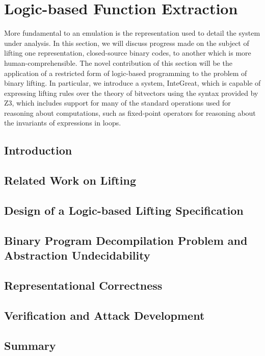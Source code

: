 \chapter{Logic-based Function Extraction}
\label{chap:integreat}

More fundamental to an emulation is the representation used to detail the system under analysis.
In this section, we will discuss progress made on the subject of lifting one representation, closed-source binary codes, to another which is more human-comprehensible.
The novel contribution of this section will be the application of a restricted form of logic-based programming to the problem of binary lifting.
In particular, we introduce a system, InteGreat, which is capable of expressing lifting rules over the theory of bitvectors using the syntax provided by Z3, which includes support for many of the standard operations used for reasoning about computations, such as fixed-point operators for reasoning about the invariants of expressions in loops.

\section{Introduction}

\section{Related Work on Lifting}

\section{Design of a Logic-based Lifting Specification}

\section{Binary Program Decompilation Problem and Abstraction Undecidability}

\section{Representational Correctness}

\section{Verification and Attack Development}

\section{Summary}
